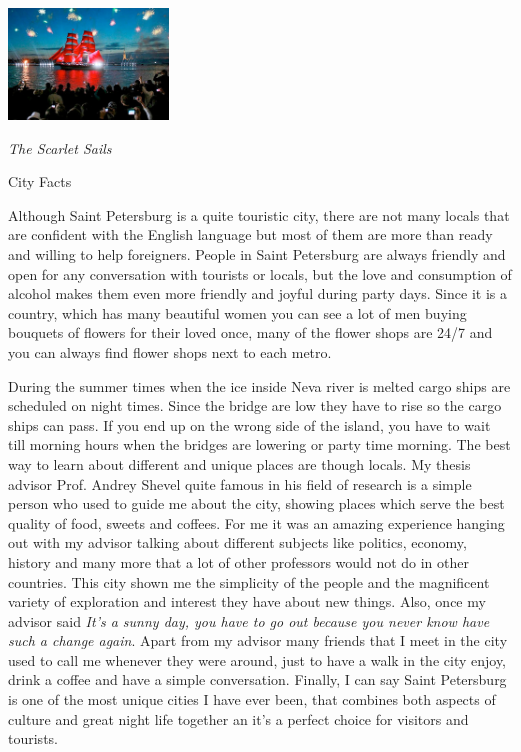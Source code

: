 \documentclass[10pt,a4paper]{article} %
\newcommand{\NewsItem}[1]{ %
\usefont{T1}{fvs}{n}{n} %
\vspace{24pt}\large #1\vspace{3pt} %
\par \normalsize \normalfont}
\begin{document}
\begin{multicols}{3}
\begin{center}
	\includegraphics[width=0.32\textwidth]{media/scarlet_sails.jpg}
	\par\textit{The Scarlet Sails}
\end{center}

\NewsItem{City Facts}

Although Saint Petersburg is a quite touristic city, 
there are not many locals that are confident with the English language 
but most of them are more than ready and willing to help foreigners. 
People in Saint Petersburg are always friendly and open for any conversation 
with tourists or locals, but the love and consumption of alcohol makes them even 
more friendly and joyful during party days. 
Since it is a country, which has many beautiful women you can see a lot of men 
buying bouquets of flowers for their loved once, 
many of the flower shops are 24/7 and you can always find flower shops next to each metro.

During the summer times when the ice inside Neva river is melted cargo ships are 
scheduled on night times. 
Since the bridge are low they have to rise so the cargo ships can pass. 
If you end up on the wrong side of the island, 
you have to wait till morning hours when the bridges are lowering or party time morning.
The best way to learn about different and unique places are though locals. 
My thesis advisor Prof. Andrey Shevel quite famous in his field of research 
is a simple person who used to guide me about the city, 
showing places which serve the best quality of food, sweets and coffees. 
For me it was an amazing experience hanging out with 
my advisor talking about different subjects like politics, economy, 
history and many more that a lot of other professors would not do in other countries. 
This city shown me the simplicity of the people and the magnificent variety of exploration 
and interest they have about new things. 
Also, once my advisor said \textit{It's a sunny day, 
	you have to go out because you never know have such a change again}. 
Apart from my advisor many friends that I meet in the city used to call 
me whenever they were around, just to have a walk in the city enjoy, 
drink a coffee and have a simple conversation. 
Finally, I can say Saint Petersburg is one of the most unique cities I have ever been, 
that combines both aspects of culture and great night life together an 
it's a perfect choice for visitors and tourists.


\end{multicols}
\end{document}
